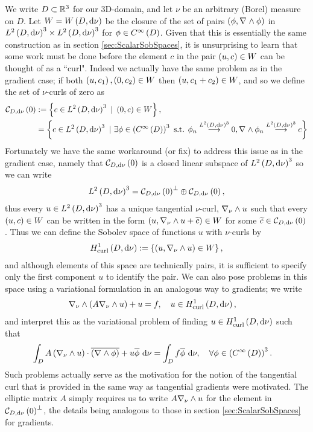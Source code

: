 We write $D\subset\mathbb{R}^3$ for our 3D-domain, and let $\nu$ be an arbitrary (Borel) measure on $D$.
Let $W=W\left( D,\mathrm{d}\nu \right)$ be the closure of the set of pairs $\left( \phi, \nabla_{}\wedge\phi \right)$ in $L^{2}\left( D,\mathrm{d}\nu \right)^3\times L^{2}\left( D,\mathrm{d}\nu \right)^3$ for $\phi\in C^{\infty}\left( D \right)$.
Given that this is essentially the same construction as in section \ref{sec:ScalarSobSpaces}, it is unsurprising to learn that some work must be done before the element $c$ in the pair $\left( u,c \right)\in W$ can be thought of as a ``curl".
Indeed we actually have the same problem as in the gradient case; if both $\left( u,c_1 \right), \left( 0, c_2 \right)\in W$ then $\left( u,c_1+c_2 \right)\in W$, and so we define the set of $\nu$-curls of zero as
\begin{align*}
	\curlZero{D}{\nu} &:= \clbracs{ c\in\ltwo{D}{\nu}^3 \ \vert \ \bracs{0,c}\in W }, \\
	&= \clbracs{ c\in\ltwo{D}{\nu}^3 \ \vert \ \exists\phi\in\bracs{\smooth{D}}^3 \text{ s.t. } \phi_n\lconv{\ltwo{D}{\nu}^3}0, \curl{}\phi_n\lconv{\ltwo{D}{\nu}^3}c }
\end{align*}
Fortunately we have the same workaround (or fix) to address this issue as in the gradient case, namely that $\mathcal{C}_{ D, \mathrm{d}\nu}\left( 0 \right)$ is a closed linear subspace of $L^{2}\left( D,\mathrm{d}\nu \right)^3$ so we can write
\begin{align*}
	L^{2}\left( D,\mathrm{d}\nu \right)^3 = \mathcal{C}_{ D, \mathrm{d}\nu}\left( 0 \right)^\perp \oplus \mathcal{C}_{ D, \mathrm{d}\nu}\left( 0 \right),
\end{align*}
thus every $u\in L^{2}\left( D,\mathrm{d}\nu \right)^3$ has a unique tangential $\nu$-curl, $\nabla_{\nu}\wedge u$ such that every $\left( u,c \right)\in W$ can be written in the form $\left( u, \nabla_{\nu}\wedge u + \widetilde{c} \right)\in W$ for some $\widetilde{c}\in\mathcal{C}_{ D, \mathrm{d}\nu}\left( 0 \right)$.
Thus we can define the Sobolev space of functions $u$ with $\nu$-curls by
\begin{align*}
	H^1_\mathrm{curl}\left( D, \mathrm{d}\nu \right) := \left\{  \left( u,\nabla_{\nu}\wedge u \right)\in W  \right\},
\end{align*}
and although elements of this space are technically pairs, it is sufficient to specify only the first component $u$ to identify the pair.
We can also pose problems in this space using a variational formulation in an analogous way to gradients; we write
\begin{align*}
	\nabla_{\nu}\wedge\left( A\nabla_{\nu}\wedge u \right) + u &= f, \quad u\in H^1_\mathrm{curl}\left( D, \mathrm{d}\nu \right),
\end{align*}
and interpret this as the variational problem of finding $u\in H^1_\mathrm{curl}\left( D, \mathrm{d}\nu \right)$ such that
\begin{align*}
	\int_{D} A\left( \nabla_{\nu}\wedge u \right)\cdot\overline{\left( \nabla_{}\wedge\phi \right)} + u\overline{\phi} \ \mathrm{d}\nu &= \int_{D} f\overline{\phi}  \ \mathrm{d}\nu, \quad \forall\phi\in\left( C^{\infty}\left( D \right) \right)^3.
\end{align*}
Such problems actually serve as the motivation for the notion of the tangential curl that is provided in the same way as tangential gradients were motivated.
The elliptic matrix $A$ simply requires us to write $A\nabla_{\nu}\wedge u$ for the element in $\mathcal{C}_{ D, \mathrm{d}\nu}\left( 0 \right)^\perp$, the details being analogous to those in section \ref{sec:ScalarSobSpaces} for gradients. \newline

